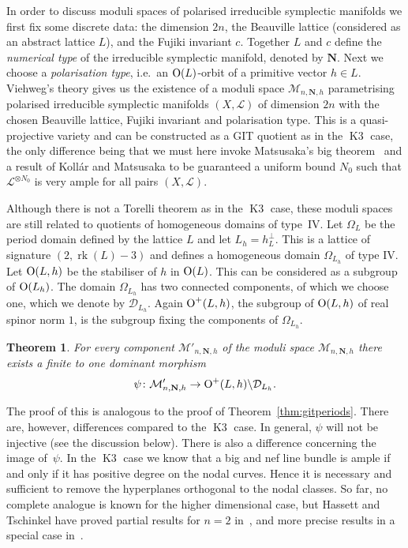 \documentclass[a4paper,11pt]{article}
\newtheorem{theorem}[lemma]{Theorem}
\renewcommand{\cD}{\mathcal D}
\renewcommand{\cL}{\mathcal L}
\newcommand{\cM}{\mathcal M}
\newcommand{\Orth}{\mathop{\null\mathrm {O}}\nolimits}
\newcommand{\rk}{\mathop{\mathrm {rk}}\nolimits}
\newcommand{\bdN}{\mathbf N}
\newcommand{\Kthree}{\mathop{\mathrm {K3}}\nolimits}
\begin{document}
In order to discuss moduli spaces of polarised irreducible symplectic
mani\-folds we first fix some discrete data: the dimension $2n$, the
Beauville lattice (considered as an abstract lattice $L$), and the
Fujiki invariant $c$. Together $L$ and $c$ define the \emph{numerical
  type} of the irreducible symplectic manifold, denoted by $\bdN$.
Next we choose a \emph{polarisation type}, i.e.\ an $\Orth(L)$-orbit
of a primitive vector $h \in L$. Viehweg's theory gives us the
existence of a moduli space $\cM_{n,\bdN,h}$ parametrising polarised
irreducible symplectic manifolds $(X,\cL)$ of dimension $2n$ with the
chosen Beauville lattice, Fujiki invariant and polarisation type.
This is a quasi-projective variety and can be constructed as a GIT
quotient as in the $\Kthree$ case, the only difference being that we
must here invoke Matsusaka's big theorem~\cite{Mat} and a result of
Koll\'ar and Matsusaka \cite{KM} to be guaranteed a uniform bound
$N_0$ such that $\cL^{\otimes N_0}$ is very ample for all pairs
$(X,\cL)$.

Although there is not a Torelli theorem as in the $\Kthree$ case,
these moduli spaces are still related to quotients of homogeneous
domains of type~IV.  Let $\Omega_L$ be the period domain defined by
the lattice $L$ and let $L_h=h^{\perp}_L$. This is a lattice of
signature $(2,\rk(L)-3)$ and defines a homogeneous domain
$\Omega_{L_h}$ of type IV. Let $\Orth(L,h)$ be the stabiliser of $h$
in $\Orth(L)$. This can be considered as a subgroup of
$\Orth(L_h)$. The domain $\Omega_{L_h}$ has two connected components,
of which we choose one, which we denote by $\cD_{L_h}$. Again
$\Orth^+(L,h)$, the subgroup of $\Orth(L,h)$ of real spinor norm
$1$, is the subgroup fixing the components of $\Omega_{L_h}$.

\begin{theorem}\label{thm:modulisymplectic}
For every component $\cM'_{n,\bdN,h}$ of the moduli space
$\cM_{n,\bdN,h}$ there exists a finite to one dominant morphism
\begin{equation*}
\psi\colon  \cM'_{n,\bdN,h} \to \Orth^+(L,h) \backslash \cD_{L_h}.
\end{equation*}
\end{theorem}
The proof of this is analogous to the proof of
Theorem~\ref{thm:gitperiods}. There are, however, differences compared
to the $\Kthree$ case.  In general, $\psi$ will not be injective (see
the discussion below).  There is also a difference concerning the
image of~$\psi$.  In the $\Kthree$ case we know that a big and nef
line bundle is ample if and only if it has positive degree on the
nodal curves.  Hence it is necessary and sufficient to remove the
hyperplanes orthogonal to the nodal classes. So far, no complete
analogue is known for the higher dimensional case, but Hassett and
Tschinkel have proved partial results for $n=2$ in~\cite{HT1}, and
more precise results in a special case in~\cite{HT2}.
\end{document}
